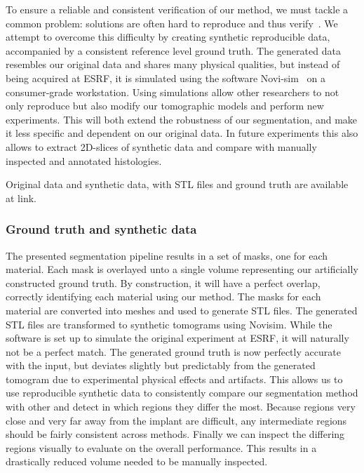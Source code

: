 To ensure a reliable and consistent verification of our method, we must tackle
a common problem: solutions are often hard to reproduce and thus
verify~\cite{replication-crisis}. We attempt to overcome this difficulty by
creating synthetic reproducible data, accompanied by a consistent reference
level ground truth. The generated data resembles our original data and shares
many physical qualities, but instead of being acquired at ESRF, it is simulated
using the software Novi-sim~\cite{novisim} on a consumer-grade workstation.
Using simulations allow other researchers to not only reproduce but also modify
our tomographic models and perform new experiments. This will both extend the
robustness of our segmentation, and make it less specific and dependent on our
original data.  In future experiments this also allows to extract 2D-slices of
synthetic data and compare with manually inspected and annotated histologies.

Original data and synthetic data, with STL files and ground truth are available
at link.


\subsubsection{Ground truth and synthetic data}

The presented segmentation pipeline results in a set of masks, one for each
material.  Each mask is overlayed unto a single volume representing our
artificially constructed ground truth. By construction, it will have a perfect
overlap, correctly identifying each material using our method.  The masks for
each material are converted into meshes and used to generate STL files.  The
generated STL files are transformed to synthetic tomograms using Novisim.
While the software is set up to simulate the original experiment at ESRF, it
will naturally not be a perfect match. The generated ground truth is now
perfectly accurate with the input, but deviates slightly but predictably from
the generated tomogram due to experimental physical effects and artifacts. This
allows us to use reproducible synthetic data to consistently compare our
segmentation method with other and detect in which regions they differ the
most. Because regions very close and very far away from the implant are
difficult, any intermediate regions should be fairly consistent across methods.
Finally we can inspect the differing regions visually to evaluate on the
overall performance. This results in a drastically reduced volume needed to be
manually inspected.

